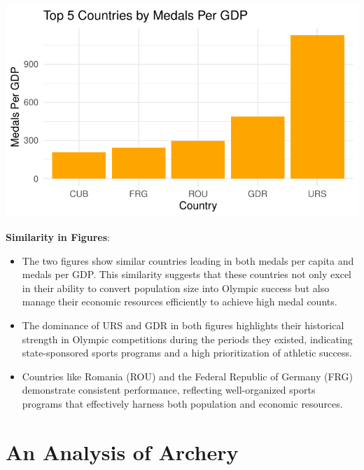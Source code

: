 \documentclass[12pt,preprint, authoryear]{elsarticle}
\let\origfigure\figure
\let\endorigfigure\endfigure
\renewenvironment{figure}[1][2] {
    \expandafter\origfigure\expandafter[H]
} {
    \endorigfigure
}
\numberwithin{equation}{section}
\numberwithin{figure}{section}
\numberwithin{table}{section}
\begin{document}
\begin{figure}

{\centering \includegraphics{README_files/figure-latex/unnamed-chunk-3-1} 

}

\caption{The Top Countries that Dominate Winning Medals Per Capita\label{Figure3}}\label{fig:unnamed-chunk-3}
\end{figure}

\textbf{Similarity in Figures}:

\begin{itemize}
\item
  The two figures show similar countries leading in both medals per
  capita and medals per GDP. This similarity suggests that these
  countries not only excel in their ability to convert population size
  into Olympic success but also manage their economic resources
  efficiently to achieve high medal counts.
\item
  The dominance of URS and GDR in both figures highlights their
  historical strength in Olympic competitions during the periods they
  existed, indicating state-sponsored sports programs and a high
  prioritization of athletic success.
\item
  Countries like Romania (ROU) and the Federal Republic of Germany (FRG)
  demonstrate consistent performance, reflecting well-organized sports
  programs that effectively harness both population and economic
  resources.
\end{itemize}

\hypertarget{an-analysis-of-archery}{%
\section{An Analysis of Archery}\label{an-analysis-of-archery}}
\end{document}
